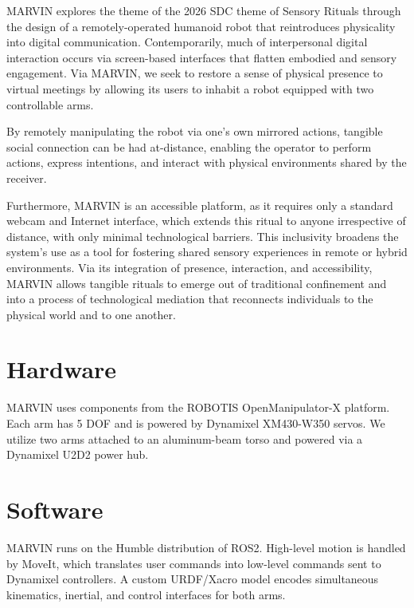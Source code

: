 \documentclass[acmsmall, screen]{acmart}
\begin{document}
MARVIN explores the theme of the 2026 SDC theme of Sensory Rituals through the design of a remotely-operated humanoid robot that reintroduces physicality into digital communication. Contemporarily, much of interpersonal digital interaction occurs via screen-based interfaces that flatten embodied and sensory engagement. Via MARVIN, we seek to restore a sense of physical presence to virtual meetings by allowing its users to inhabit a robot equipped with two controllable arms.

By remotely manipulating the robot via one's own mirrored actions, tangible social connection can be had at-distance, enabling the operator to perform actions, express intentions, and interact with physical environments shared by the receiver.

Furthermore, MARVIN is an accessible platform, as it requires only a standard webcam and Internet interface, which extends this ritual to anyone irrespective of distance, with only minimal technological barriers. This inclusivity broadens the system's use as a tool for fostering shared sensory experiences in remote or hybrid environments. Via its integration of presence, interaction, and accessibility, MARVIN allows tangible rituals to emerge out of traditional confinement and into a process of technological mediation that reconnects individuals to the physical world and to one another.


\section{Hardware}
MARVIN uses components from the ROBOTIS OpenManipulator-X platform. Each arm has 5 DOF and is powered by Dynamixel XM430-W350 servos. We utilize two arms attached to an aluminum-beam torso and powered via a Dynamixel U2D2 power hub.

\section{Software}
MARVIN runs on the Humble distribution of ROS2. High-level motion is handled by MoveIt, which translates user commands into low-level commands sent to Dynamixel controllers. A custom URDF/Xacro model encodes simultaneous kinematics, inertial, and control interfaces for both arms.
\end{document}
